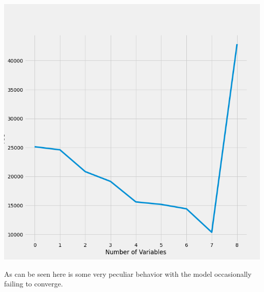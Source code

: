 \documentclass{article}
\begin{document}
	\includegraphics[scale = 0.2]{../plots/python/AICStepwise4L.png}
	
	As can be seen here is some very peculiar behavior with the model 
	occasionally failing to converge. 
	
	
\end{document}
